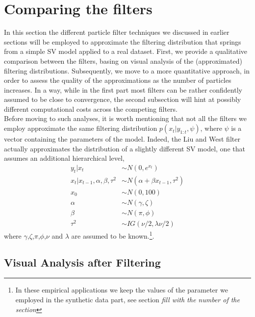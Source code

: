 \documentclass[
]{book}
\theoremstyle{break}
\theoremstyle{nonumberplain}
\begin{document}
\section{Comparing the filters}

In this section the different particle filter techniques we discussed in
earlier sections will be employed to approximate the filtering
distribution that springs from a simple SV model applied to a real
dataset. First, we provide a qualitative comparison between the filters,
basing on visual analysis of the (approximated) filtering distributions.
Subsequently, we move to a more quantitative approach, in order to
assess the quality of the approximations as the number of particles
increases. In a way, while in the first part most filters can be rather
confidently assumed to be close to convergence, the second subsection
will hint at possibly different computational costs across the competing
filters.\\
Before moving to such analyses, it is worth mentioning that not all the
filters we employ approximate the same filtering distribution
\(p(x_t|y_{1:t},\psi)\), where \(\psi\) is a vector containing the
parameters of the model. Indeed, the Liu and West filter actually
approximates the distribution of a slightly different SV model, one that
assumes an additional hierarchical level, \begin{align*}
y_t|x_t & \sim N(0,e^{x_t})\\
x_t|x_{t-1},\alpha,\beta,\tau^2 & \sim N(\alpha+\beta x_{t-1},\tau^2)\\
x_0 & \sim N(0,100)\\
\alpha & \sim N(\gamma,\zeta)\\
\beta & \sim N(\pi,\phi)\\
\tau^2 & \sim IG(\nu/2,\lambda \nu/2)
\end{align*} where \(\gamma\),\(\zeta\),\(\pi\),\(\phi\),\(\nu\) and
\(\lambda\) are assumed to be
known.\footnote{In these empirical applications we keep the values of the parameter we employed in the synthetic data part, see section \textit{fill with the number of the section}}.\\

\subsection{Visual Analysis after Filtering}
\end{document}
